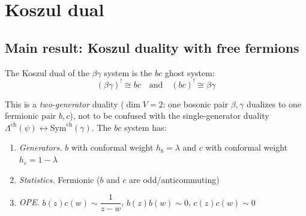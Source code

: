 \section{Koszul dual}
\label{sec:betagamma-koszul-dual}

\subsection{Main result: Koszul duality with free fermions}

\begin{theorem}
\label{thm:betagamma-fermion-koszul}
The Koszul dual of the $\beta\gamma$ system is the $bc$ ghost system:
\[(\beta\gamma)^! \cong bc \quad \text{and} \quad (bc)^! \cong \beta\gamma\]

This is a \emph{two-generator} duality ($\dim V = 2$: one bosonic pair
$\beta, \gamma$ dualizes to one fermionic pair $b, c$), not to be confused with
the single-generator duality $\Lambda^{\mathrm{ch}}(\psi) \leftrightarrow
\mathrm{Sym}^{\mathrm{ch}}(\gamma)$.  The $bc$ system has:
\begin{enumerate}
\item \emph{Generators.} $b$ with conformal weight $h_b = \lambda$ and $c$ with conformal weight $h_c = 1 - \lambda$
\item \emph{Statistics.} Fermionic ($b$ and $c$ are odd/anticommuting)
\item \emph{OPE.} $b(z)c(w) \sim \dfrac{1}{z-w}$, \quad $b(z)b(w) \sim 0$, \quad $c(z)c(w) \sim 0$
\end{enumerate}
\end{theorem}

